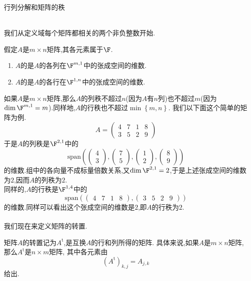 \documentclass{ctexart}
\begin{document}
\pagestyle{empty}
\begin{center}\large 行列分解和矩阵的秩\end{center}
\\
我们从定义域每个矩阵都相关的两个非负整数开始.
\begin{definition}[1.1 定义:行秩,列秩]
    假定$A$是$m\times n$矩阵,其各元素属于$\F$.
    \begin{enumerate}[label=\tbf{(\alph*)}]
        \item $A$的是$A$的各列在$\F^{m,1}$中的张成空间的维数.
        \item $A$的是$A$的各行在$\F^{1,n}$中的张成空间的维数.
    \end{enumerate}
\end{definition}\noindent
如果$A$是$m\times n$矩阵,那么$A$的列秩不超过$n$(因为$A$有$n$列)也不超过$m$(因为$\dim\F^{m,1}=m$).同样地,$A$的行秩也不超过$\min\left\{m,n\right\}$.
我们以下面这个简单的矩阵为例.
$$A=\begin{pmatrix}
    4 & 7 & 1 & 8 \\
    3 & 5 & 2 & 9
\end{pmatrix}$$
于是$A$的列秩是$\F^{2,1}$中的
$$\text{span}\left(
\begin{pmatrix}4\\3\end{pmatrix},
\begin{pmatrix}7\\5\end{pmatrix},
\begin{pmatrix}1\\2\end{pmatrix},
\begin{pmatrix}8\\9\end{pmatrix}
\right)$$
的维数.组中的各向量不成标量倍数关系,又$\dim\F^{2,1}=2$,于是上述张成空间的维数为$2$,因而$A$的列秩为$2$.\\
同样的,$A$的行秩是$\F^{1,4}$中的
$$\text{span}\left(
\begin{pmatrix}4&7&1&8\end{pmatrix},
\begin{pmatrix}3&5&2&9\end{pmatrix}
\right)$$
的维数.同样可以看出这个张成空间的维数是$2$,即$A$的行秩为$2$.\\
\\
我们现在来定义矩阵的转置.
\begin{definition}[2.1 定义:转置]
    矩阵$A$的转置记为$A^\text{t}$,是互换$A$的行和列所得的矩阵.
    具体来说,如果$A$是$m\times n$矩阵,那么$A^\text{t}$是$n\times m$矩阵,
    其中各元素由$$\left(A^\text{t}\right)_{k,j}=A_{j,k}$$给出.
\end{definition}\noindent
\end{document}
